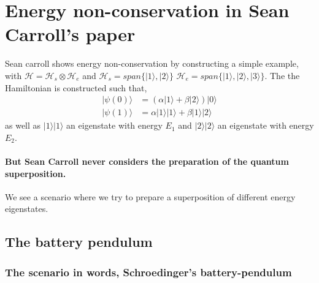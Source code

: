 \documentclass{article}
\begin{document}
\section{Energy non-conservation in Sean Carroll's paper}
Sean carroll shows energy non-conservation by constructing a simple example, with $\mathcal{H}=\mathcal{H}_s\otimes\mathcal{H}_e$ and $\mathcal{H}_s=span\{|1\rangle,|2\rangle\}$ $\mathcal{H}_e=span\{|1\rangle,|2\rangle,|3\rangle\}$. The the Hamiltonian is constructed such that,
\begin{align}
    |\psi(0)\rangle&=(\alpha|1\rangle+\beta|2\rangle)|0\rangle\\
    |\psi(1)\rangle&=\alpha|1\rangle|1\rangle+\beta|1\rangle|2\rangle
\end{align}
as well as $|1\rangle|1\rangle$ an eigenstate with energy $E_1$ and $|2\rangle|2\rangle$ an eigenstate with energy $E_2$.

\begin{comment}
He suggests an experiment, with a particle in a magnetic field ndergoing spin interaction with another particle passing by. this second particle is then measured. the idea is to start p1 in a superposition of spins (and so energies, being in a magnetic field). by interaction with the passing p2 entangle them. measure p2 collapsing p1 and making the system change from 0 (avg) to 2 worlds of +-E the spin energy in B. 

\begin{align}
    |\psi(t_0)\rangle&=(|\downarrow\rangle+|\uparrow\rangle)|e\rangle=|w_0\rangle\\
    &\rightarrow|\downarrow\rangle|e_1'\rangle+|\uparrow\rangle|e_2'\rangle=|w_1\rangle+|w_2\rangle
\end{align}
\end{comment}

\paragraph{But Sean Carroll never considers the preparation of the quantum superposition.} We see a scenario where we try to prepare a superposition of different energy eigenstates. 

\subsection{The battery pendulum}

\subsubsection{The scenario in words, Schroedinger's battery-pendulum}
\end{document}
